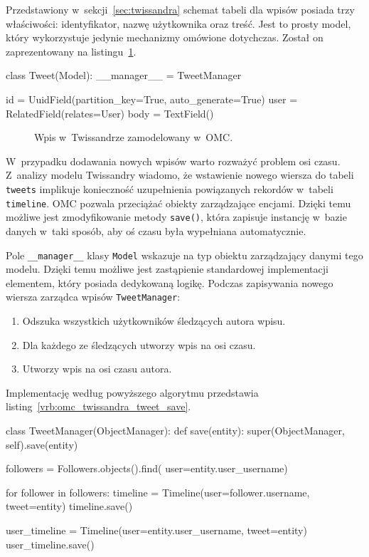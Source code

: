 Przedstawiony w~sekcji~\ref{sec:twissandra} schemat tabeli dla wpisów posiada trzy właściwości: identyfikator, nazwę użytkownika oraz treść. Jest to prosty model, który wykorzystuje jedynie mechanizmy omówione dotychczas. Został on zaprezentowany na listingu~\ref{vrb:omc_twissandra_tweet}.

\begin{verbbox}
	class Tweet(Model):
	    __manager__ = TweetManager

	    id = UuidField(partition_key=True, 
	                   auto_generate=True)
	    user = RelatedField(relates=User)
	    body = TextField()
\end{verbbox}

\begin{figure}[ht!]
	\centering
	\theverbbox
	\caption{Wpis w~Twissandrze zamodelowany w~OMC.}
	\label{vrb:omc_twissandra_tweet}
\end{figure}

W~przypadku dodawania nowych wpisów warto rozważyć problem osi czasu. Z~analizy modelu Twissandry wiadomo, że wstawienie nowego wiersza do tabeli \verb+tweets+ implikuje konieczność uzupełnienia powiązanych rekordów w~tabeli \verb+timeline+. OMC pozwala przeciążać obiekty zarządzające encjami. Dzięki temu możliwe jest zmodyfikowanie metody \verb+save()+, która zapisuje instancję w~bazie danych w~taki sposób, aby oś czasu była wypełniana automatycznie.

Pole \verb+__manager__+ klasy \verb+Model+ wskazuje na typ obiektu zarządzający danymi tego modelu. Dzięki temu możliwe jest zastąpienie standardowej implementacji elementem, który posiada dedykowaną logikę. Podczas zapisywania nowego wiersza zarządca wpisów \verb+TweetManager+:

\begin{enumerate}
	\item Odszuka wszystkich użytkowników śledzących autora wpisu.
	\item Dla każdego ze śledzących utworzy wpis na osi czasu.
	\item Utworzy wpis na osi czasu autora.
\end{enumerate}

\noindent Implementację według powyższego algorytmu przedstawia listing~\ref{vrb:omc_twissandra_tweet_save}.

\begin{verbbox}
	class TweetManager(ObjectManager):
	    def save(entity):
	        super(ObjectManager, self).save(entity)

	        followers = Followers.objects().find(
	                        user=entity.user_username)

	        for follower in followers:
	            timeline = Timeline(user=follower.username, 
	                                tweet=entity)
	            timeline.save()

	        user_timeline = Timeline(user=entity.user_username, 
	                                 tweet=entity)
	        user_timeline.save()
\end{verbbox}

